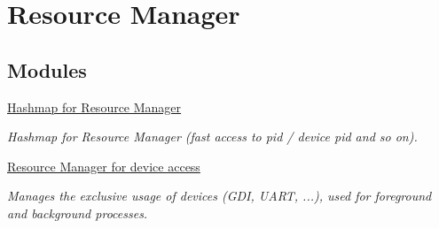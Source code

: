 \hypertarget{group___r_e_s_o_u_r_c_e___m_a_n_a_g_e_r}{
\section{Resource Manager}
\label{group___r_e_s_o_u_r_c_e___m_a_n_a_g_e_r}
}
\subsection*{Modules}
\begin{CompactItemize}
\item 
\hyperlink{group___h_a_s_h_m_a_p}{Hashmap for Resource Manager}
\begin{CompactList}\small\item\em Hashmap for Resource Manager (fast access to pid / device pid and so on). \item\end{CompactList}

\item 
\hyperlink{group___r_e_s_o_u_r_c_e___m}{Resource Manager for device access}
\begin{CompactList}\small\item\em Manages the exclusive usage of devices (GDI, UART, ...), used for foreground and background processes. \item\end{CompactList}

\end{CompactItemize}
